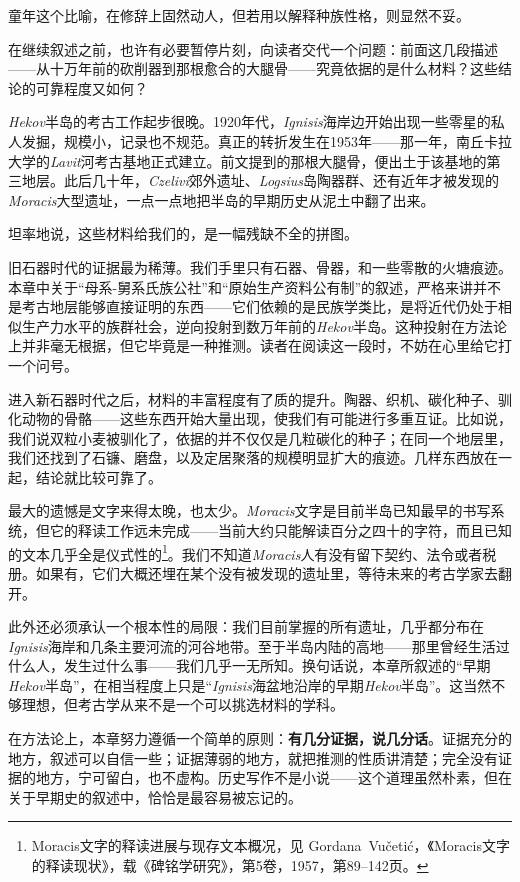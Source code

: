 童年这个比喻，在修辞上固然动人，但若用以解释种族性格，则显然不妥。

在继续叙述之前，也许有必要暂停片刻，向读者交代一个问题：前面这几段描述——从十万年前的砍削器到那根愈合的大腿骨——究竟依据的是什么材料？这些结论的可靠程度又如何？

\textit{Hekov}半岛的考古工作起步很晚。1920年代，\textit{Ignisis}海岸边开始出现一些零星的私人发掘，规模小，记录也不规范。真正的转折发生在1953年——那一年，南丘卡拉大学的\textit{Lavit}河考古基地正式建立。前文提到的那根大腿骨，便出土于该基地的第三地层。此后几十年，\textit{Czelivi}郊外遗址、\textit{Logsius}岛陶器群、还有近年才被发现的\textit{Moracis}大型遗址，一点一点地把半岛的早期历史从泥土中翻了出来。

坦率地说，这些材料给我们的，是一幅残缺不全的拼图。

旧石器时代的证据最为稀薄。我们手里只有石器、骨器，和一些零散的火塘痕迹。本章中关于``母系-舅系氏族公社''和``原始生产资料公有制''的叙述，严格来讲并不是考古地层能够直接证明的东西——它们依赖的是民族学类比，是将近代仍处于相似生产力水平的族群社会，逆向投射到数万年前的\textit{Hekov}半岛。这种投射在方法论上并非毫无根据，但它毕竟是一种推测。读者在阅读这一段时，不妨在心里给它打一个问号。

进入新石器时代之后，材料的丰富程度有了质的提升。陶器、织机、碳化种子、驯化动物的骨骼——这些东西开始大量出现，使我们有可能进行多重互证。比如说，我们说双粒小麦被驯化了，依据的并不仅仅是几粒碳化的种子；在同一个地层里，我们还找到了石镰、磨盘，以及定居聚落的规模明显扩大的痕迹。几样东西放在一起，结论就比较可靠了。

最大的遗憾是文字来得太晚，也太少。\textit{Moracis}文字是目前半岛已知最早的书写系统，但它的释读工作远未完成——当前大约只能解读百分之四十的字符，而且已知的文本几乎全是仪式性的\footnote{Moracis文字的释读进展与现存文本概况，见 Gordana~Vučetić，《Moracis文字的释读现状》，载《碑铭学研究》，第5卷，1957，第89--142页。}。我们不知道\textit{Moracis}人有没有留下契约、法令或者税册。如果有，它们大概还埋在某个没有被发现的遗址里，等待未来的考古学家去翻开。

此外还必须承认一个根本性的局限：我们目前掌握的所有遗址，几乎都分布在\textit{Ignisis}海岸和几条主要河流的河谷地带。至于半岛内陆的高地——那里曾经生活过什么人，发生过什么事——我们几乎一无所知。换句话说，本章所叙述的``早期\textit{Hekov}半岛''，在相当程度上只是``\textit{Ignisis}海盆地沿岸的早期\textit{Hekov}半岛''。这当然不够理想，但考古学从来不是一个可以挑选材料的学科。

在方法论上，本章努力遵循一个简单的原则：\textbf{有几分证据，说几分话}。证据充分的地方，叙述可以自信一些；证据薄弱的地方，就把推测的性质讲清楚；完全没有证据的地方，宁可留白，也不虚构。历史写作不是小说——这个道理虽然朴素，但在关于早期史的叙述中，恰恰是最容易被忘记的。

